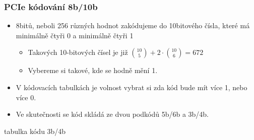 \documentclass{beamer}
\begin{document}
\begin{frame}
\frametitle{PCIe kódování 8b/10b}

\begin{itemize}
\item 8bitů, neboli 256 různých hodnot zakódujeme do 10bitového čísla, které má minimálně čtyři 0 a minimálně čtyři 1
\begin{itemize}
\item Takových 10-bitových čísel je již ${10 \choose 5} + 2\cdot {10 \choose 6}= 672$
\item Vybereme si takové, kde se hodně mění 1.
\end{itemize}
\item V kódovacích tabulkách je volnost vybrat si zda kód bude mít více 1, nebo více 0.
\item Ve skutečnosti se kód skládá ze dvou podkódů 5b/6b a 3b/4b.
\end{itemize}

\bigskip
tabulka kódu 3b/4b
\end{frame}
\end{document}
